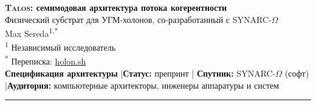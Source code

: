 \documentclass[10pt,letterpaper]{article}
\theoremstyle{talos}
\newcommand{\SYNARC}{\textsc{SYNARC}-$\Omega$\xspace}
\begin{document}
\begin{center}
  {\LARGE\bfseries
  \textsc{Talos}: семимодовая архитектура потока когерентности}\\[6pt]
  {\large Физический субстрат для УГМ-холонов, со-разработанный с \SYNARC{}}\\[16pt]
  {\large Max Sereda\textsuperscript{1,*}}\\[8pt]
  {\small
  \textsuperscript{1} Независимый исследователь\\[4pt]
  \textsuperscript{*} Переписка: \href{https://holon.sh}{holon.sh}
  }\\[14pt]
  {\small\color{plosgray}
  \textbf{Спецификация архитектуры} \quad|\quad \textbf{Статус:} препринт \quad|\quad
  \textbf{Спутник:} \SYNARC{} (софт) \quad|\quad \textbf{Аудитория:} компьютерные архитекторы, инженеры аппаратуры и систем
  }
\end{center}

\vspace{10pt}\hrule\vspace{10pt}
\end{document}
